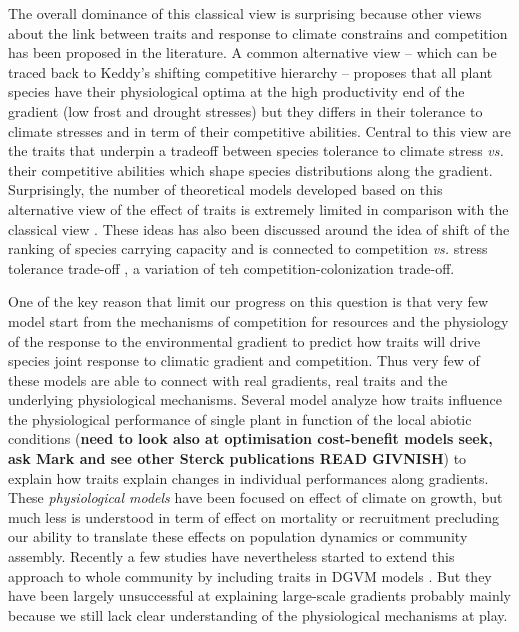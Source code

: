 \documentclass[a4paper,11pt]{article}
\begin{document}
The overall dominance of this classical view is surprising because other views about the link between traits and response to climate constrains and competition has been proposed in the literature. A common alternative view -- which can be traced back to Keddy's shifting competitive hierarchy \citep{Keddy-1989}-- proposes that all plant species have their physiological optima at the high productivity end of the gradient (low frost and drought stresses) but they differs in their tolerance to climate stresses and in term of their competitive abilities\citep{Keddy-1989}. Central to this view are the traits that underpin a tradeoff between species tolerance to climate stress \textit{vs.} their competitive abilities which shape species distributions along the gradient. Surprisingly, the number of theoretical models developed based on this alternative view of the effect of traits is extremely limited in comparison with the classical view \citep{Smith-1989,Lienard-2016}. These ideas has also been discussed around the idea of shift of the ranking of species carrying capacity \citep{Case-2005} and is connected to competition \textit{vs.} stress tolerance trade-off \citep{Muller-Landau-2010}, a variation of teh competition-colonization trade-off.


One of the key reason that limit our progress on this question is that very few model start from the mechanisms of competition for resources and the physiology of the response to the environmental gradient to predict how traits will drive species joint response to climatic gradient and competition. Thus very few of these models are able to connect with real gradients,
real traits and the underlying physiological mechanisms. Several model
analyze how traits influence the physiological performance of single
plant in function of the local abiotic conditions \citep{Sterck-2011}
(\textbf{need to look also at optimisation cost-benefit models seek, ask Mark
and see other Sterck publications READ GIVNISH}) to explain how traits explain changes in individual performances along gradients. These \textit{physiological models} have been focused on effect of climate on growth, but much less is understood in term of effect on mortality or recruitment precluding our ability to translate these effects on population dynamics or community assembly. Recently a few studies have nevertheless started to extend this approach to whole community by including traits in DGVM models \citep[see][]{Sakschewski-2015,Scheiter-2013}. But they have been largely unsuccessful at explaining large-scale gradients probably mainly because we still lack clear understanding of the physiological mechanisms at play.
\end{document}
